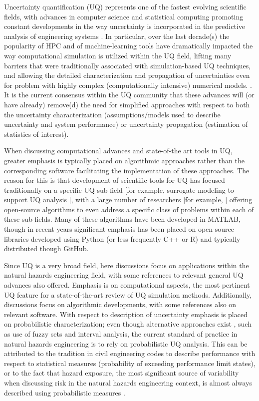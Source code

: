 Uncertainty quantification (UQ) represents one of the fastest evolving scientific fields, with advances in computer science and statistical computing promoting constant developments in the way uncertainty is incorporated in the predictive analysis of engineering systems \citep{smith2013uncertainty}. In particular, over the last decade(s) the popularity of HPC and of machine-learning tools have dramatically impacted the way computational simulation is utilized within the UQ field, lifting many barriers that were traditionally associated with simulation-based UQ techniques, and allowing the detailed characterization and propagation of uncertainties even for problem with highly complex (computationally intensive) numerical models. . It is the current consensus within the UQ community that these advances will (or have already) remove(d) the need for simplified approaches with respect to both the uncertainty characterization (assumptions/models used to describe uncertainty and system performance) or uncertainty propagation (estimation of statistics of interest). 

When discussing computational advances and state-of-the art tools in UQ, greater emphasis is typically placed on algorithmic approaches rather than the corresponding software facilitating the implementation of these approaches. The reason for this is that development of scientific tools for UQ has focused traditionally on a specific UQ sub-field [for example, surrogate modeling to support UQ analysis \citep{lophaven2002dacea,gorissen2010surrogate}], with a large number of researchers [for example, \citep{bect2017bayesian,clement2018methods}] offering open-source algorithms to even address a specific class of problems within each of these sub-fields. Many of these algorithms have been developed in MATLAB, though in recent years significant emphasis has been placed on open-source libraries developed using Python (or less frequently C++ or R) and typically distributed though GitHub.    

Since UQ is a very broad field, here discussions focus on applications within the natural hazards engineering field, with some references to relevant general UQ advances also offered. Emphasis is on computational aspects, the most pertinent UQ feature for a state-of-the-art review of UQ simulation methods. Additionally, discussions focus on algorithmic developments, with some references also on relevant software. With respect to description of uncertainty emphasis is placed on probabilistic characterization; even though alternative approaches exist \citep{beer2013imprecise}, such as use of fuzzy sets and interval analysis, the current standard of practice in natural hazards engineering is to rely on probabilistic UQ analysis. This can be attributed to the tradition in civil engineering codes to describe performance with respect to statistical measures (probability of exceeding performance limit states), or to the fact that hazard exposure, the most significant source of variability when discussing risk in the natural hazards engineering context, is almost always described using probabilistic measures \citep{mcguire2004seismic, resio2007white}. 

